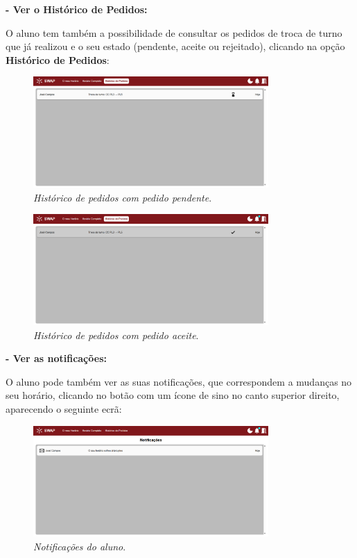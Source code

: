 \documentclass[12pt, a4paper]{article}
\begin{document}
\textbf{- Ver o Histórico de Pedidos:}

O aluno tem também a possibilidade de consultar os pedidos de troca de
turno que já realizou e o seu estado (pendente, aceite ou rejeitado),
clicando na opção \textbf{Histórico de Pedidos}:

\begin{figure}[H]
    \centering
    \includegraphics[width=0.8\textwidth]{res/manual/historico_pedidos.png}
    \caption{\emph{Histórico de pedidos com pedido pendente}.}
    \label{historico_pedidos}
\end{figure}

\begin{figure}[H]
    \centering
    \includegraphics[width=0.8\textwidth]{res/manual/historico_pedidos_resolvido.png}
    \caption{\emph{Histórico de pedidos com pedido aceite}.}
    \label{historico_pedidos_resolvido}
\end{figure}

\textbf{- Ver as notificações:}

O aluno pode também ver as suas notificações, que correspondem a mudanças no
seu horário, clicando no botão com um ícone de sino no canto superior direito,
aparecendo o seguinte ecrã:

\begin{figure}[H]
    \centering
    \includegraphics[width=0.8\textwidth]{res/manual/notificacoes_aluno.png}
    \caption{\emph{Notificações do aluno}.}
    \label{notificacoes_aluno}
\end{figure}
\end{document}
